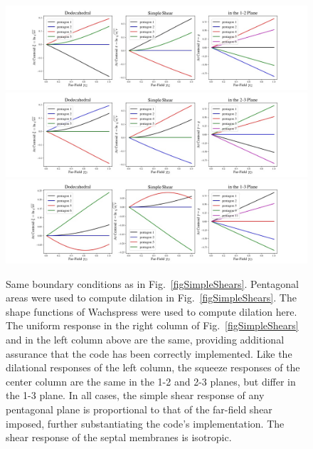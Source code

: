 \begin{figure}
	\centering
	\includegraphics[width=\textwidth]{figures/pentagonalSimpleShear12.jpg} \\
	\includegraphics[width=\textwidth]{figures/pentagonalSimpleShear23.jpg} \\
	\includegraphics[width=\textwidth]{figures/pentagonalSimpleShear13.jpg} \\
	\caption{Same boundary conditions as in Fig.~\ref{figSimpleShears}.  Pentagonal areas were used to compute dilation in Fig.~\ref{figSimpleShears}.  The shape functions of Wachspress were used to compute dilation here. The uniform response in the right column of Fig.~\ref{figSimpleShears} and in the left column above are the same, providing additional assurance that the code has been correctly implemented.  Like the dilational responses of the left column, the squeeze responses of the center column are the same in the 1-2 and 2-3 planes, but differ in the 1-3 plane.  In all cases, the simple shear response of any pentagonal plane is proportional to that of the far-field shear imposed, further substantiating the code's implementation.  The shear response of the septal membranes is isotropic.}
	\label{figSimpleShearsPentagons}
\end{figure}

